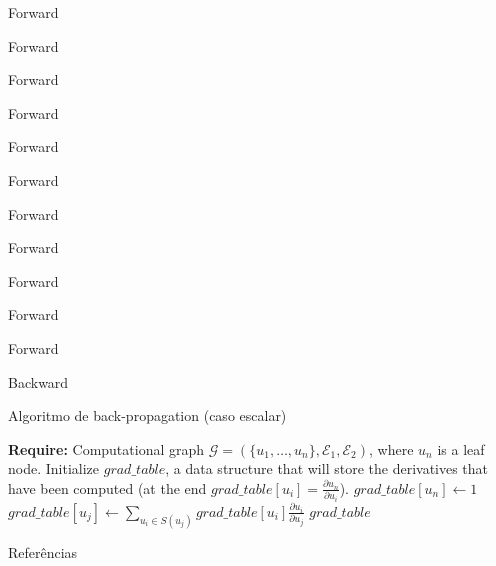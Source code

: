 \documentclass[10pt]{beamer}
\begin{document}
\begin{frame}{Forward}

\end{frame}

\begin{frame}{Forward}

\end{frame}

\begin{frame}{Forward}

\end{frame}

\begin{frame}{Forward}

\end{frame}

\begin{frame}{Forward}

\end{frame}

\begin{frame}{Forward}

\end{frame}

\begin{frame}{Forward}

\end{frame}

\begin{frame}{Forward}

\end{frame}

\begin{frame}{Forward}

\end{frame}

\begin{frame}{Forward}

\end{frame}

\begin{frame}{Forward}

\end{frame}

\begin{frame}{Backward}

\end{frame}


\begin{frame}{Algoritmo de back-propagation (caso escalar)}
\begin{algorithm}[H]
\begin{algorithmic}[1]
\STATE \textbf{Require:} Computational graph $\mathcal{G} = (\{ u_1, \dots, u_n \}, \mathcal{E}_1, \mathcal{E}_2)$, where $u_n$ is a leaf node.
\STATE Initialize $grad\_table$, a data structure that will store the derivatives that have been computed (at the end $grad\_table[u_i] = \frac{\partial u_n}{\partial u_i}$).
\STATE $grad\_table[u_n] \leftarrow 1$
\STATE $grad\_table[u_j] \leftarrow \sum_{u_{i} \in S(u_{j})}grad\_table[u_i]\frac{\partial u_i}{\partial u_j}$
\ENDFOR
\RETURN $grad\_table$
\end{algorithmic}
\caption{Back-propagation (scalar case)}
\label{alg:seq}
\end{algorithm}
\end{frame}


\begin{frame}[allowframebreaks]{Referências}

  
  

\end{frame}
\end{document}
